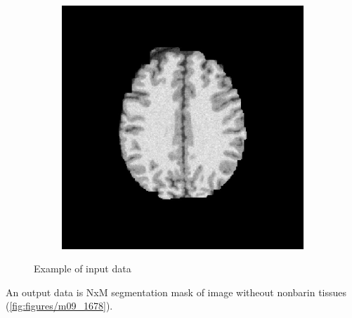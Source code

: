 \begin{figure}[H]
\begin{subfigure}[b]{0.25\linewidth}
	\end{subfigure}
	\begin{subfigure}[b]{0.25\linewidth}
		\includegraphics[width=\linewidth]{figures/Module_09/m09_7}
	\end{subfigure}
	\caption{Example of input data} 
	\label{fig:figures/m09_567}
\end{figure} 

An output data is NxM segmentation mask of image witheout nonbarin tissues (\ref{fig:figures/m09_1678}). 

